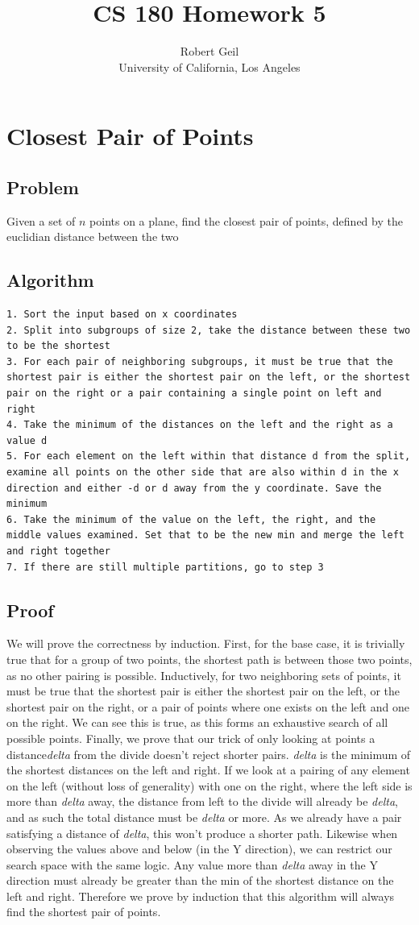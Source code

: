 \documentclass[titlepage]{article}
\title{CS 180 Homework 5}
\author{Robert Geil \\
University of California, Los Angeles
}
\numberwithin{equation}{subsection}
\begin{document}
\section{Closest Pair of Points}
\subsection{Problem}
Given a set of $n$ points on a plane, find the closest pair of points, defined by the euclidian distance
between the two
\subsection{Algorithm}
\begin{lstlisting}
1. Sort the input based on x coordinates
2. Split into subgroups of size 2, take the distance between these two to be the shortest
3. For each pair of neighboring subgroups, it must be true that the shortest pair is either the shortest pair on the left, or the shortest pair on the right or a pair containing a single point on left and right
4. Take the minimum of the distances on the left and the right as a value d
5. For each element on the left within that distance d from the split, examine all points on the other side that are also within d in the x direction and either -d or d away from the y coordinate. Save the minimum
6. Take the minimum of the value on the left, the right, and the middle values examined. Set that to be the new min and merge the left and right together
7. If there are still multiple partitions, go to step 3
\end{lstlisting}
\subsection{Proof}
We will prove the correctness by induction. First, for the base case, it is trivially true that for a group of
two points, the shortest path is between those two points, as no other pairing is possible. Inductively, for two
neighboring sets of points, it must be true that the shortest pair is either the shortest pair on the left, or
the shortest pair on the right, or a pair of points where one exists on the left and one on the right. We can see
this is true, as this forms an exhaustive search of all possible points. Finally, we prove that our trick of
only looking at points a distance\textit{delta} from the divide doesn't reject shorter pairs. \textit{delta} is the minimum of the
shortest distances on the left and right. If we look at a pairing of any element on the left (without loss of 
generality) with one on the right, where the left side is more than \textit{delta} away, the distance from left to the 
divide will already be \textit{delta}, and as such the total distance must be \textit{delta} or more. As we already have a pair
satisfying a distance of \textit{delta}, this won't produce a shorter path. Likewise when observing the values above and
below (in the Y direction), we can restrict our search space with the same logic. Any value more than \textit{delta} 
away in the Y direction must already be greater than the min of the shortest distance on the left and right.
Therefore we prove by induction that this algorithm will always find the shortest pair of points.
\end{document}
